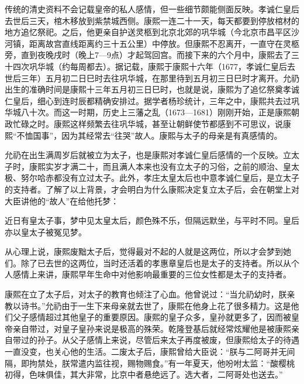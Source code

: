 
传统的清史资料不会记载皇帝的私人感情，但一些细节颇能侧面反映。孝诚仁皇后去世后三天，棺木移放到紫禁城西侧。康熙一连二十一天，每天都要到停放棺材的地方追忆祭祀。之后，他更亲自护送灵柩到北京北郊的巩华城（今北京市昌平区沙河镇，距离故宫直线距离约三十五公里）中停放。但康熙不忍离开，一直守在灵柩旁，直到夜晚戌时（晚上7—9点）才起驾回宫。而接下来的六个月中，康熙去了三十四次巩华城（约每周都去）。据记载，康熙于康熙十六年（1677，孝诚仁皇后去世后三年）五月初二日巳时去往巩华城，在那里待到五月初三日巳时才离开。允礽出生的准确时间是康熙十三年五月初三日巳时，也就是说，康熙为了追忆祭奠孝诚仁皇后，细心到连时辰都精确安排过。据学者杨珍统计，三年之中，康熙共去过巩华城八十次。而这一时期，历史上三藩之乱（1673—1681）刚刚开始，正是康熙朝政忙碌之时。康熙这样频繁去往巩华城，甚至让朝鲜使节都感到不可思议，说康熙“不恤国事”，因为其经常去“往哭”故人。康熙与太子的母亲是有真感情的。



允礽在出生满周岁后就被立为太子，也是康熙对孝诚仁皇后感情的一个反映。立太子时，康熙实岁才满二十，而且满人本来也没有立太子的习俗，之前的顺治、皇太极、努尔哈赤都没有立过太子。此外，孝庄太皇太后也中意孝诚仁皇后，是立太子的支持者。了解了以上背景，才会明白为什么康熙决定复立太子后，会在朝堂上对大臣讲他的“故人”在给他托梦：



\begin{bookquote}近日有皇太子事，梦中见太皇太后，颜色殊不乐，但隔远默坐，与平时不同。皇后亦以皇太子被冤见梦。\end{bookquote}


从心理上说，康熙废黜太子后，觉得最对不起的人就是这两位，所以才会梦到她们。除了已去世的这两位，当时还活着的孝惠章皇后也是太子的支持者。所以从个人感情上来讲，康熙早年生命中对他影响最重要的三位女性都是太子的支持者。



康熙在立了太子后，对太子的教育也倾注了心血。他曾说过：“当允礽幼时，朕亲教以诗书。”允礽由于一生下来母亲就去世了，康熙在他身上花了很多精力。这是他们父子感情超过其他皇子的重要原因。康熙的皇子众多，皇孙就更多了，因而被皇帝亲自带过，对皇子皇孙来说是极高的殊荣。乾隆登基后就经常炫耀他是被康熙亲自带过的孙子。从父子感情上来说，尽管后来太子再度被废，但康熙给太子的待遇一直没变，也关心他的生活。二废太子后，康熙曾给大臣说：“朕与二阿哥并无间隔，即拘禁处，朕常遣内监往视，赐物赐食。”有一年夏天，他吩咐太监：“酸樱桃初得，色味俱佳，其大非常，比京中者悬绝远了。选大者，二阿哥处也送去。”


